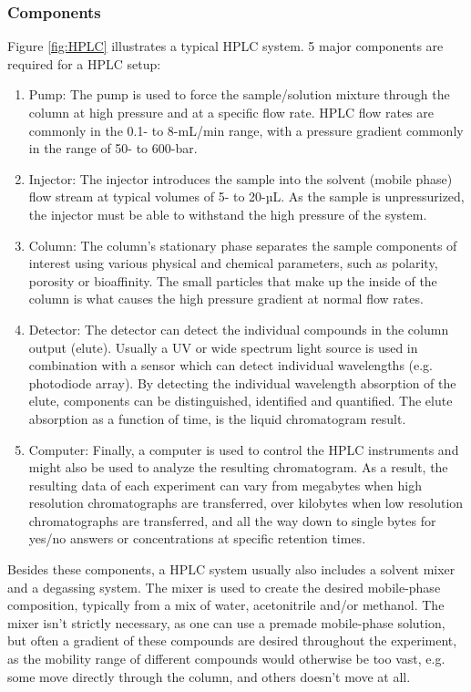 \subsubsection{Components}
Figure \ref{fig:HPLC} illustrates a typical HPLC system. 5 major components are required for a HPLC setup:
\begin{enumerate}
    \item Pump: The pump is used to force the sample/solution mixture through the column at high pressure and at a specific flow rate. HPLC flow rates are commonly in the 0.1- to 8-mL/min range, with a pressure gradient commonly in the range of 50- to 600-bar.
    \item Injector: The injector introduces the sample into the solvent (mobile phase) flow stream at typical volumes of 5- to 20-µL. As the sample is unpressurized, the injector must be able to withstand the high pressure of the system.
    \item Column: The column’s stationary phase separates the sample components of interest using various physical and chemical parameters, such as polarity, porosity or bioaffinity. The small particles that make up the inside of the column is what causes the high pressure gradient at normal flow rates. 
    \item Detector: The detector can detect the individual compounds in the column output (elute). Usually a UV or wide spectrum light source is used in combination with a sensor which can detect individual wavelengths (e.g. photodiode array). By detecting the individual wavelength absorption of the elute, components can be distinguished, identified and quantified. The elute absorption as a function of time, is the liquid chromatogram result.
    \item Computer: Finally, a computer is used to control the HPLC instruments and might also be used to analyze the resulting chromatogram. As a result, the resulting data of each experiment can vary from megabytes when high resolution chromatographs are transferred, over kilobytes when low resolution chromatographs are transferred, and all the way down to single bytes for yes/no answers or concentrations at specific retention times. 
\end{enumerate}

Besides these components, a HPLC system usually also includes a solvent mixer and a degassing system. 
The mixer is used to create the desired mobile-phase composition, typically from a mix of water, acetonitrile and/or methanol. The mixer isn’t strictly necessary, as one can use a premade mobile-phase solution, but often a gradient of these compounds are desired throughout the experiment, as the mobility range of different compounds would otherwise be too vast, e.g. some move directly through the column, and others doesn’t move at all.

